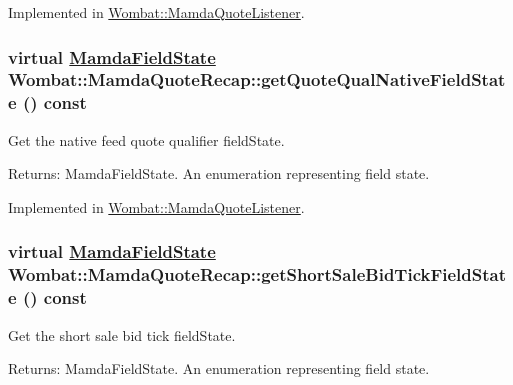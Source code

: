 Implemented in \hyperlink{classWombat_1_1MamdaQuoteListener_90a6df719e3f391f19edf4796f947b35}{Wombat::Mamda\-Quote\-Listener}.\hypertarget{classWombat_1_1MamdaQuoteRecap_1d5b1c7bd433ee7e444e83ec39c2de62}{
\subsubsection[getQuoteQualNativeFieldState]{\setlength{\rightskip}{0pt plus 5cm}virtual \hyperlink{namespaceWombat_93aac974f2ab713554fd12a1fa3b7d2a}{Mamda\-Field\-State} Wombat::Mamda\-Quote\-Recap::get\-Quote\-Qual\-Native\-Field\-State () const}}
\label{classWombat_1_1MamdaQuoteRecap_1d5b1c7bd433ee7e444e83ec39c2de62}


Get the native feed quote qualifier field\-State. 

\begin{Desc}
\item[Returns:]Mamda\-Field\-State. An enumeration representing field state. \end{Desc}


Implemented in \hyperlink{classWombat_1_1MamdaQuoteListener_9c5a520a83919f48b66dc8989d509c4c}{Wombat::Mamda\-Quote\-Listener}.\hypertarget{classWombat_1_1MamdaQuoteRecap_cfcc9d7209b6d09009c084f37e2e0510}{
\subsubsection[getShortSaleBidTickFieldState]{\setlength{\rightskip}{0pt plus 5cm}virtual \hyperlink{namespaceWombat_93aac974f2ab713554fd12a1fa3b7d2a}{Mamda\-Field\-State} Wombat::Mamda\-Quote\-Recap::get\-Short\-Sale\-Bid\-Tick\-Field\-State () const}}
\label{classWombat_1_1MamdaQuoteRecap_cfcc9d7209b6d09009c084f37e2e0510}


Get the short sale bid tick field\-State. 

\begin{Desc}
\item[Returns:]Mamda\-Field\-State. An enumeration representing field state. \end{Desc}


